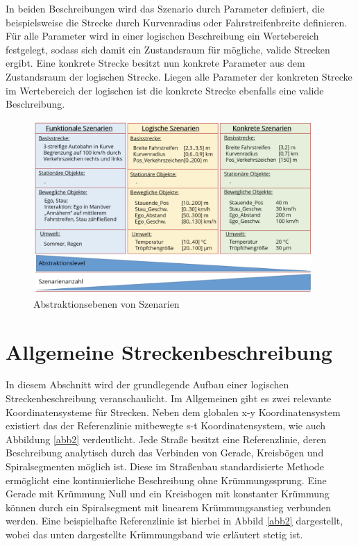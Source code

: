 In beiden Beschreibungen wird das Szenario durch Parameter definiert, die beispielsweise die Strecke durch Kurvenradius oder Fahrstreifenbreite definieren. Für alle Parameter wird in einer logischen Beschreibung ein Wertebereich festgelegt, sodass sich damit ein Zustandsraum für mögliche, valide Strecken ergibt. Eine konkrete Strecke besitzt nun konkrete Parameter aus dem Zustandsraum der logischen Strecke. Liegen alle Parameter der konkreten Strecke im Wertebereich der logischen ist die konkrete Strecke ebenfalls eine valide Beschreibung.\cite{Szenarienbeschreibung.2019}

\begin{figure}[H]
\flushleft
\includegraphics[width=0.95\textwidth]{fig/fig1b.png}
\caption{Abstraktionsebenen von Szenarien \cite{Szenarienbeschreibung.2019}}
\label{abb1}
\end{figure}

\section{Allgemeine Streckenbeschreibung}
In diesem Abschnitt wird der grundlegende Aufbau einer logischen Streckenbeschreibung veranschaulicht. Im Allgemeinen gibt es zwei relevante Koordinatensysteme für Strecken. Neben dem globalen x-y Koordinatensystem existiert das der Referenzlinie mitbewegte s-t Koordinatensystem, wie auch Abbildung \ref{abb2} verdeutlicht. Jede Straße besitzt eine Referenzlinie, deren Beschreibung analytisch durch das Verbinden von Gerade, Kreisbögen und Spiralsegmenten möglich ist. Diese im Straßenbau standardisierte Methode ermöglicht eine kontinuierliche Beschreibung ohne Krümmungssprung. Eine Gerade mit Krümmung Null und ein Kreisbogen mit konstanter Krümmung können durch ein Spiralsegment mit linearem Krümmungsanstieg verbunden werden. Eine beispielhafte Referenzlinie ist hierbei in Abbild \ref{abb2} dargestellt, wobei das unten dargestellte Krümmungsband wie erläutert stetig ist.

